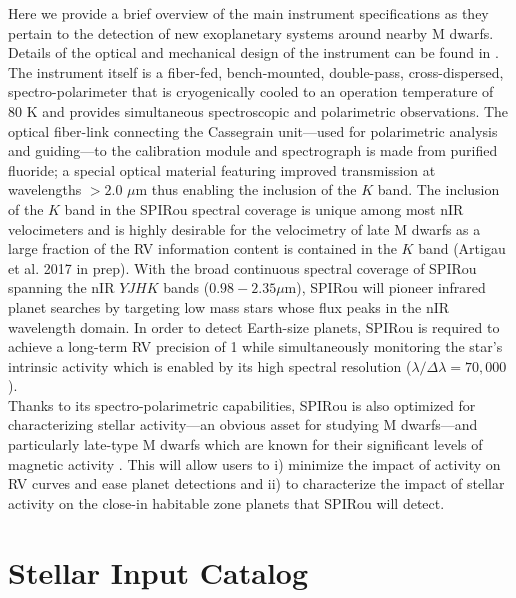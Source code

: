 Here we provide a brief overview of the main instrument specifications as they pertain to the detection of
new exoplanetary systems around nearby M dwarfs.  Details of the optical and mechanical design
of the instrument can be found in \cite{artigau14}. 
The instrument itself is a fiber-fed, bench-mounted, double-pass, cross-dispersed, spectro-polarimeter
that is cryogenically cooled to an operation temperature of 80 K and provides simultaneous spectroscopic and
polarimetric observations. The optical fiber-link connecting the
Cassegrain unit---used for polarimetric analysis and guiding---to the calibration module and spectrograph is made
from purified fluoride; a special optical material featuring improved transmission at wavelengths $>2.0$ $\mu$m thus
enabling the inclusion of the $K$ band. The inclusion of the $K$ band in the SPIRou spectral coverage
is unique among most nIR velocimeters and is highly desirable for the velocimetry of late M dwarfs as
a large fraction of the RV information content is contained in the $K$ band (Artigau et al. 2017 in prep).
With the broad continuous spectral coverage of SPIRou spanning the nIR $YJHK$ bands
($0.98-2.35 \mu$m), SPIRou will pioneer infrared planet searches by targeting low mass stars whose flux
peaks in the nIR wavelength domain. In order to detect Earth-size planets, SPIRou is required to achieve a
long-term RV precision of 1 \mps{} while simultaneously monitoring the star's intrinsic activity which is enabled
by its high spectral resolution ($\lambda/ \Delta \lambda = 70,000$). \\

Thanks to its spectro-polarimetric capabilities, SPIRou is also optimized for characterizing stellar activity---an
obvious asset for studying M dwarfs---and particularly late-type M dwarfs which are known for their significant levels
of magnetic activity \citep{west15}. This will allow users to i) minimize the impact of activity on RV curves and
ease planet detections and ii) to characterize the impact of stellar activity on the close-in habitable zone
planets that SPIRou will detect.


\section{Stellar Input Catalog} \label{BSsect:starsample}
